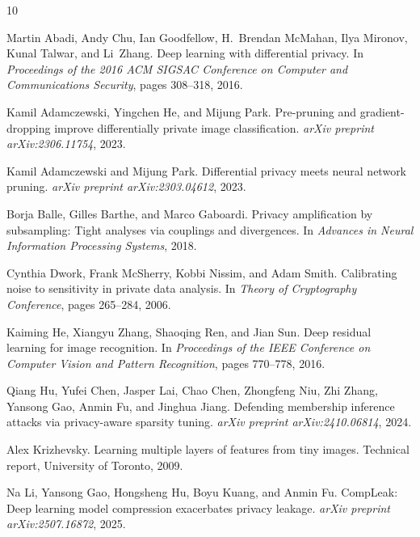 \documentclass[11pt,a4paper]{article}
\begin{document}

\begin{thebibliography}{10}

Martin Abadi, Andy Chu, Ian Goodfellow, H.~Brendan McMahan, Ilya Mironov, Kunal Talwar, and Li~Zhang.
\newblock Deep learning with differential privacy.
\newblock In \emph{Proceedings of the 2016 ACM SIGSAC Conference on Computer and Communications Security}, pages 308--318, 2016.

Kamil Adamczewski, Yingchen He, and Mijung Park.
\newblock Pre-pruning and gradient-dropping improve differentially private image classification.
\newblock \emph{arXiv preprint arXiv:2306.11754}, 2023.

Kamil Adamczewski and Mijung Park.
\newblock Differential privacy meets neural network pruning.
\newblock \emph{arXiv preprint arXiv:2303.04612}, 2023.

Borja Balle, Gilles Barthe, and Marco Gaboardi.
\newblock Privacy amplification by subsampling: Tight analyses via couplings and divergences.
\newblock In \emph{Advances in Neural Information Processing Systems}, 2018.

Cynthia Dwork, Frank McSherry, Kobbi Nissim, and Adam Smith.
\newblock Calibrating noise to sensitivity in private data analysis.
\newblock In \emph{Theory of Cryptography Conference}, pages 265--284, 2006.

Kaiming He, Xiangyu Zhang, Shaoqing Ren, and Jian Sun.
\newblock Deep residual learning for image recognition.
\newblock In \emph{Proceedings of the IEEE Conference on Computer Vision and Pattern Recognition}, pages 770--778, 2016.

Qiang Hu, Yufei Chen, Jasper Lai, Chao Chen, Zhongfeng Niu, Zhi Zhang, Yansong Gao, Anmin Fu, and Jinghua Jiang.
\newblock Defending membership inference attacks via privacy-aware sparsity tuning.
\newblock \emph{arXiv preprint arXiv:2410.06814}, 2024.

Alex Krizhevsky.
\newblock Learning multiple layers of features from tiny images.
\newblock Technical report, University of Toronto, 2009.

Na Li, Yansong Gao, Hongsheng Hu, Boyu Kuang, and Anmin Fu.
\newblock CompLeak: Deep learning model compression exacerbates privacy leakage.
\newblock \emph{arXiv preprint arXiv:2507.16872}, 2025.


\end{thebibliography}
\end{document}

